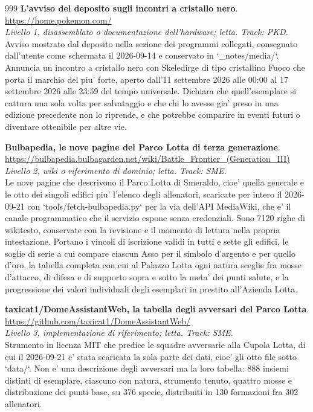 \begin{thebibliography}{999}
  \textbf{L'avviso del deposito sugli incontri a cristallo nero}.
  \\ \url{https://home.pokemon.com/}
  \\ \emph{Livello 1, disassemblato o documentazione dell'hardware; letta. Track: PKD.}
  \\ Avviso mostrato dal deposito nella sezione dei programmi collegati, consegnato dall'utente come schermata il 2026-09-14 e conservato in `\_notes/media/`. Annuncia un incontro a cristallo nero con Skeledirge di tipo cristallino Fuoco che porta il marchio del piu' forte, aperto dall'11 settembre 2026 alle 00:00 al 17 settembre 2026 alle 23:59 del tempo universale. Dichiara che quell'esemplare si cattura una sola volta per salvataggio e che chi lo avesse gia' preso in una edizione precedente non lo riprende, e che potrebbe comparire in eventi futuri o diventare ottenibile per altre vie.

  \textbf{Bulbapedia, le nove pagine del Parco Lotta di terza generazione}.
  \\ \url{https://bulbapedia.bulbagarden.net/wiki/Battle_Frontier_(Generation_III)}
  \\ \emph{Livello 2, wiki o riferimento di dominio; letta. Track: SME.}
  \\ Le nove pagine che descrivono il Parco Lotta di Smeraldo, cioe' quella generale e le otto dei singoli edifici piu' l'elenco degli allenatori, scaricate per intero il 2026-09-21 con `tools/fetch-bulbapedia.py` per la via dell'API MediaWiki, che e' il canale programmatico che il servizio espone senza credenziali. Sono 7120 righe di wikitesto, conservate con la revisione e il momento di lettura nella propria intestazione. Portano i vincoli di iscrizione validi in tutti e sette gli edifici, le soglie di serie a cui compare ciascun Asso per il simbolo d'argento e per quello d'oro, la tabella completa con cui al Palazzo Lotta ogni natura sceglie fra mosse d'attacco, di difesa e di supporto sopra e sotto la meta' dei punti salute, e la progressione dei valori individuali degli esemplari in prestito all'Azienda Lotta.

  \textbf{taxicat1/DomeAssistantWeb, la tabella degli avversari del Parco Lotta}.
  \\ \url{https://github.com/taxicat1/DomeAssistantWeb/}
  \\ \emph{Livello 3, implementazione di riferimento; letta. Track: SME.}
  \\ Strumento in licenza MIT che predice le squadre avversarie alla Cupola Lotta, di cui il 2026-09-21 e' stata scaricata la sola parte dei dati, cioe' gli otto file sotto `data/`. Non e' una descrizione degli avversari ma la loro tabella: 888 insiemi distinti di esemplare, ciascuno con natura, strumento tenuto, quattro mosse e distribuzione dei punti base, su 376 specie, distribuiti in 130 formazioni fra 302 allenatori.


\end{thebibliography}

